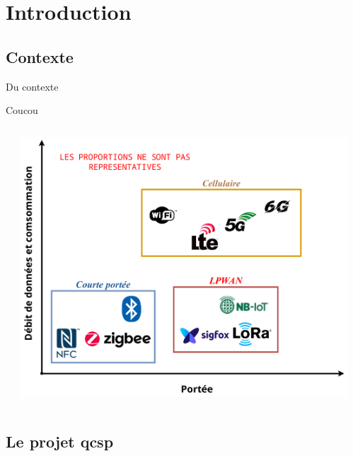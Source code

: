 \documentclass[../main.tex]{subfiles}
\begin{document}
\section{Introduction}

\subsection{Contexte}

\begin{frame}{Du contexte}
  \begin{overlayarea}{\linewidth}{.2\textheight}
    Coucou
  \end{overlayarea}
  
  \begin{columns}
    \begin{column}{.3\linewidth}
      \hfill
    \end{column}
    \begin{column}{.6\linewidth} \centering
      \includegraphics[width=\linewidth]{figures/drawiopdf/lpwan_and_co}
    \end{column}
    \begin{column}{.1\linewidth}
      \hfill
    \end{column}
  \end{columns}
\end{frame}

\subsection{Le projet \acrfull{qcsp}}
\end{document}
